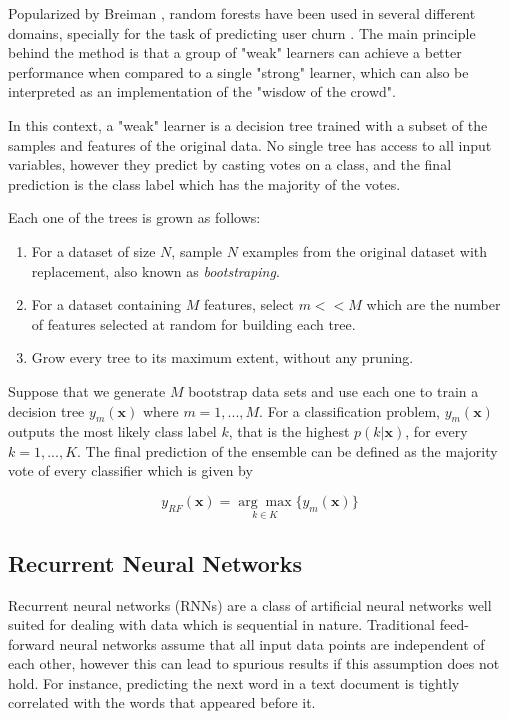 \documentclass{kththesis}
\begin{document}
Popularized by Breiman \citep{breiman2001random}, random forests have been used in several different domains, specially for the task of predicting user churn \citep{coussement2013customer} \citep{burez2008separating}. The main principle behind the method is that a group of "weak" learners can achieve a better performance when compared to a single "strong" learner, which can also be interpreted as an implementation of the "wisdow of the crowd". 

In this context, a "weak" learner is a decision tree trained with a subset of the samples and features of the original data. No single tree has access to all input variables, however they predict by casting votes on a class, and the final prediction is the class label which has the majority of the votes.

Each one of the trees is grown as follows:

\begin{enumerate}
\item For a dataset of size $N$, sample $N$ examples from the original dataset with replacement, also known as \emph{bootstraping}.
\item For a dataset containing $M$ features, select $m<<M$ which are the number of features selected at random for building each tree.
\item Grow every tree to its maximum extent, without any pruning.
\end{enumerate}

Suppose that we generate $M$ bootstrap data sets and use each one to train a decision tree $y_m(\mathbf{x})$ where $m=1,...,M$. For a classification problem, $y_m(\mathbf{x})$ outputs the most likely class label $k$, that is the highest $p(k|\mathbf{x})$, for every $k=1,...,K$. The final prediction of the ensemble can be defined as the majority vote of every classifier which is given by

\begin{equation}
y_\textit{RF}(\mathbf{x}) = \underset{k \in K}{\arg\max} \{y_m(\mathbf{x})\}
\end{equation}

\subsection{Recurrent Neural Networks}

Recurrent neural networks (RNNs) are a class of artificial neural networks well suited for dealing with data which is sequential in nature. Traditional feed-forward neural networks assume that all input data points are independent of each other, however this can lead to spurious results if this assumption does not hold. For instance, predicting the next word in a text document is tightly correlated with the words that appeared before it. 
\end{document}
